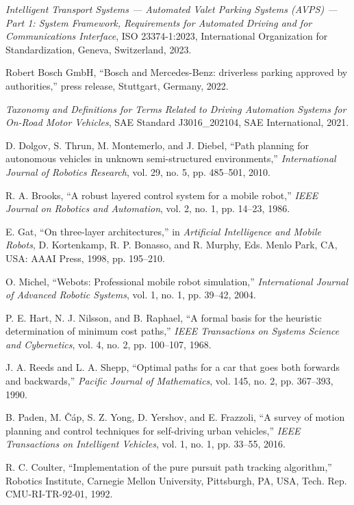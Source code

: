 \documentclass[12pt,a4paper]{article}
\begin{document}
\begin{enumerate}[label={[\arabic*]},leftmargin=*,itemsep=2pt]
\item \textit{Intelligent Transport Systems --- Automated Valet Parking Systems (AVPS) --- Part 1: System Framework, Requirements for Automated Driving and for Communications Interface}, ISO 23374-1:2023, International Organization for Standardization, Geneva, Switzerland, 2023.
\item Robert Bosch GmbH, ``Bosch and Mercedes-Benz: driverless parking approved by authorities,'' press release, Stuttgart, Germany, 2022.
\item \textit{Taxonomy and Definitions for Terms Related to Driving Automation Systems for On-Road Motor Vehicles}, SAE Standard J3016\_202104, SAE International, 2021.
\item D. Dolgov, S. Thrun, M. Montemerlo, and J. Diebel, ``Path planning for autonomous vehicles in unknown semi-structured environments,'' \textit{International Journal of Robotics Research}, vol. 29, no. 5, pp. 485--501, 2010.
\item R. A. Brooks, ``A robust layered control system for a mobile robot,'' \textit{IEEE Journal on Robotics and Automation}, vol. 2, no. 1, pp. 14--23, 1986.
\item E. Gat, ``On three-layer architectures,'' in \textit{Artificial Intelligence and Mobile Robots}, D. Kortenkamp, R. P. Bonasso, and R. Murphy, Eds. Menlo Park, CA, USA: AAAI Press, 1998, pp. 195--210.
\item O. Michel, ``Webots: Professional mobile robot simulation,'' \textit{International Journal of Advanced Robotic Systems}, vol. 1, no. 1, pp. 39--42, 2004.
\item P. E. Hart, N. J. Nilsson, and B. Raphael, ``A formal basis for the heuristic determination of minimum cost paths,'' \textit{IEEE Transactions on Systems Science and Cybernetics}, vol. 4, no. 2, pp. 100--107, 1968.
\item J. A. Reeds and L. A. Shepp, ``Optimal paths for a car that goes both forwards and backwards,'' \textit{Pacific Journal of Mathematics}, vol. 145, no. 2, pp. 367--393, 1990.
\item B. Paden, M. \v{C}\'{a}p, S. Z. Yong, D. Yershov, and E. Frazzoli, ``A survey of motion planning and control techniques for self-driving urban vehicles,'' \textit{IEEE Transactions on Intelligent Vehicles}, vol. 1, no. 1, pp. 33--55, 2016.
\item R. C. Coulter, ``Implementation of the pure pursuit path tracking algorithm,'' Robotics Institute, Carnegie Mellon University, Pittsburgh, PA, USA, Tech. Rep. CMU-RI-TR-92-01, 1992.

\end{enumerate}
\end{document}
